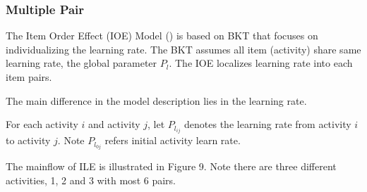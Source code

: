 \documentclass{article}
\begin{document}
\begin{center}
\end{center}


\subsubsection{Multiple Pair}

The Item Order Effect (IOE) Model (\cite{multipair}) is based on BKT that focuses on individualizing the learning rate. The BKT assumes all item (activity) share same learning rate, the global parameter \( P_l \). The IOE localizes learning rate into each item pairs.

The main difference in the model description lies in the learning rate.

For each activity \( i \) and activity \( j \), let \( P_{l_{ij}} \) denotes the learning rate from activity \( i \) to activity \( j \). Note \( P_{l_{0j}} \) refers initial activity learn rate.

The mainflow of ILE is illustrated in Figure 9. Note there are three different activities, 1, 2 and 3 with most 6 pairs.
\end{document}
